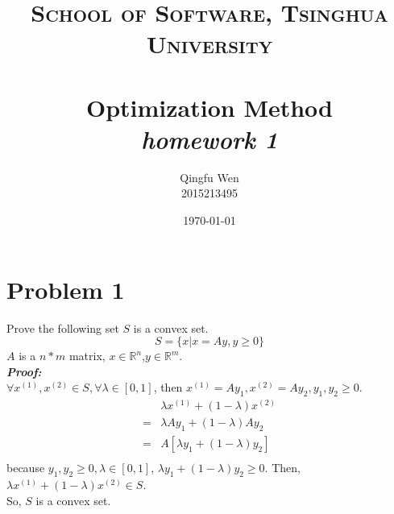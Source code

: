 \documentclass[paper=a4, fontsize=11pt]{scrartcl} %
\title{	
\normalfont \normalsize
\textsc{School of Software, Tsinghua University} \\ [25pt] %
\horrule{0.5pt} \\[0.4cm] %
\huge Optimization Method\\ %
\LARGE\textit{homework 1}
\horrule{2pt} \\[0.5cm] %
}
\author{Qingfu Wen \\ \normalsize 2015213495} %
\date{\normalsize\today} %
\numberwithin{equation}{section} %
\numberwithin{figure}{section} %
\numberwithin{table}{section} %
\begin{document}
\maketitle %
\tableofcontents
\newpage

\section{Problem 1}
Prove the following set $S$ is a convex set.
\begin{equation}  \nonumber
S = \{x|x=Ay, y\geq0\}
\end{equation}
$A$ is a $n*m$ matrix, $x\in \mathbb{R}^n$,$y\in \mathbb{R}^m$.\\
\emph{\textbf{Proof:}}\\
$\forall x^{(1)}, x^{(2)}\in S, \forall \lambda \in [0, 1]$, then $x^{(1)}=Ay_1, x^{(2)}=Ay_2, y_1,y_2\geq0$.
\begin{align*}          
& \lambda x^{(1)}+(1-\lambda)x^{(2)}\\         
=& \lambda Ay_1+(1-\lambda)Ay_2\\      
=& A[\lambda y_1+(1-\lambda)y_2]\\      
\end{align*}
because $y_1,y_2\geq0,\lambda\in[0,1]$, $\lambda y_1+(1-\lambda)y_2\geq0$. Then, $\lambda x^{(1)}+(1-\lambda)x^{(2)} \in S$.\\
So, $S$ is a convex set.
\end{document}
